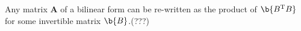 

\begin{theorem}
Any matrix $\bm A$ of a bilinear form can be re-written as the product of $\b{B^\T B}$ for some invertible matrix $\b{B}$.(???)
\end{theorem}


